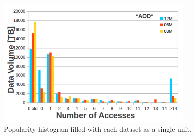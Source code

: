 \begin{figure}[htpb]
  \begin{center}
    \includegraphics[width=0.85\textwidth]{plots/per_dataset.png}
  \end{center}
  \caption{Popularity histogram filled with each dataset as a single unit.}  
  \label{fig:datasets}
\end{figure}



\clearpage

